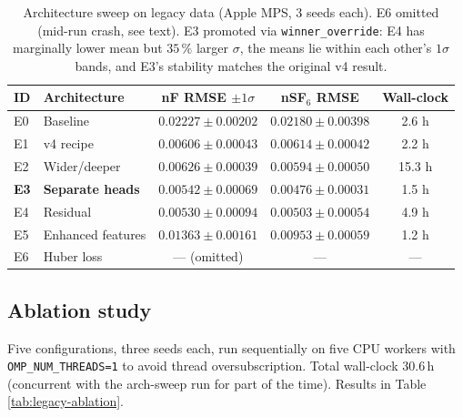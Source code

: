 \documentclass[11pt,a4paper]{article}
\begin{document}
\begin{table}[H]
  \centering
  \caption{Architecture sweep on legacy data (Apple MPS, 3 seeds each).
           E6 omitted (mid-run crash, see text).
           E3 promoted via \texttt{winner\_override}: E4 has marginally
           lower mean but $35\,\%$ larger $\sigma$, the means lie
           within each other's $1\sigma$ bands, and E3's stability
           matches the original v4 result.}
  \label{tab:legacy-archsweep}
  \small
  \begin{tabular}{l l c c c}
    \toprule
    ID & Architecture & nF RMSE $\pm 1\sigma$ & nSF$_6$ RMSE & Wall-clock \\
    \midrule
    E0 & Baseline                  & $0.02227 \pm 0.00202$ & $0.02180 \pm 0.00398$ & 2.6 h \\
    E1 & v4 recipe                 & $0.00606 \pm 0.00043$ & $0.00614 \pm 0.00042$ & 2.2 h \\
    E2 & Wider/deeper              & $0.00626 \pm 0.00039$ & $0.00594 \pm 0.00050$ & 15.3 h \\
    \textbf{E3} & \textbf{Separate heads} & $\mathbf{0.00542 \pm 0.00069}$ & $\mathbf{0.00476 \pm 0.00031}$ & 1.5 h \\
    E4 & Residual                  & $0.00530 \pm 0.00094$ & $0.00503 \pm 0.00054$ & 4.9 h \\
    E5 & Enhanced features         & $0.01363 \pm 0.00161$ & $0.00953 \pm 0.00059$ & 1.2 h \\
    E6 & Huber loss                & --- (omitted)         & ---                   & --- \\
    \bottomrule
  \end{tabular}
\end{table}

\subsection{Ablation study}
Five configurations, three seeds each, run sequentially on five CPU
workers with \texttt{OMP\_NUM\_THREADS=1} to avoid thread
oversubscription.  Total wall-clock 30.6\,h (concurrent with the
arch-sweep run for part of the time).  Results in Table
\ref{tab:legacy-ablation}.
\end{document}
